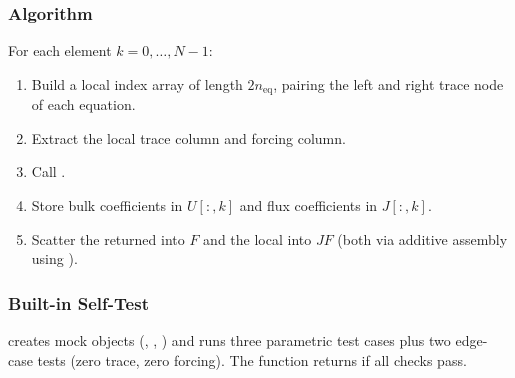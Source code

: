 \subsubsection{Algorithm}

For each element $k = 0, \ldots, N{-}1$:
\begin{enumerate}
  \item Build a local index array of length $2 n_\mathrm{eq}$, pairing the left and right trace node of each equation.
  \item Extract the local trace column and forcing column.
  \item Call .
  \item Store bulk coefficients in $U[:,k]$ and flux coefficients in $J[:,k]$.
  \item Scatter the returned  into $F$ and the local  into $JF$ (both via additive assembly using ).
\end{enumerate}

\subsubsection{Built-in Self-Test}

 creates mock objects (, , ) and runs three parametric test cases plus two edge-case tests (zero trace, zero forcing).  The function returns  if all checks pass.
